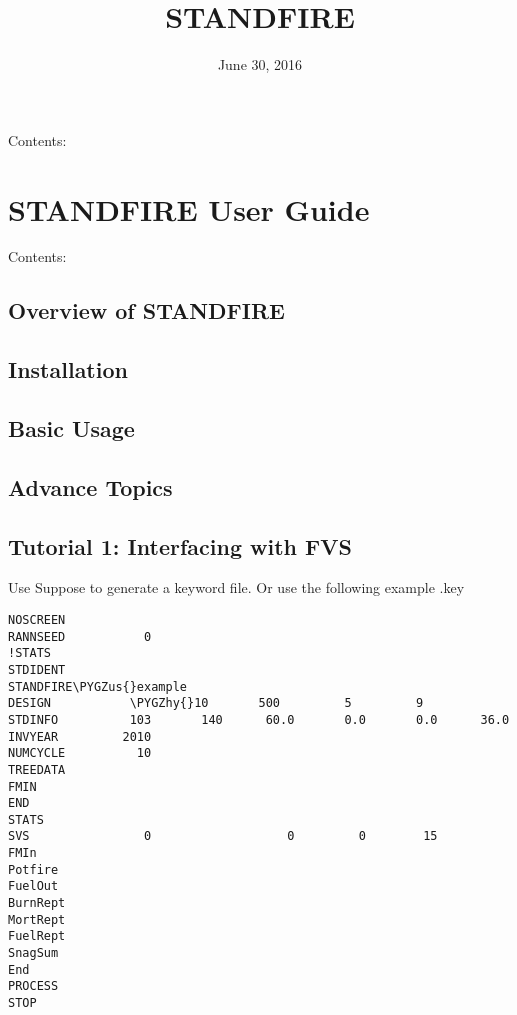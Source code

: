 \documentclass[letterpaper,10pt,english]{sphinxmanual}
\title{STANDFIRE}
\date{June 30, 2016}
\author{}
\def\PYGZus{\char`\_}
\def\PYGZhy{\char`\-}
\begin{document}
\maketitle
\tableofcontents
{}\label{index::doc}


Contents:


\chapter{STANDFIRE User Guide}
\label{user_guide:standfire-user-guide}\label{user_guide::doc}\label{user_guide:welcome-to-standfire}
Contents:


\section{Overview of STANDFIRE}
\label{overview:overview-of-standfire}\label{overview::doc}

\section{Installation}
\label{installation:installation}\label{installation::doc}

\section{Basic Usage}
\label{basic_usage::doc}\label{basic_usage:basic-usage}

\section{Advance Topics}
\label{advance_topics:advance-topics}\label{advance_topics::doc}

\section{Tutorial 1: Interfacing with FVS}
\label{tutorial_1:tutorial-1-interfacing-with-fvs}\label{tutorial_1::doc}
Use Suppose to generate a keyword file. Or use the following example .key

\begin{Verbatim}[commandchars=\\\{\}]
NOSCREEN
RANNSEED           0
!STATS
STDIDENT
STANDFIRE\PYGZus{}example
DESIGN           \PYGZhy{}10       500         5         9
STDINFO          103       140      60.0       0.0       0.0      36.0
INVYEAR         2010
NUMCYCLE          10
TREEDATA
FMIN
END
STATS
SVS                0                   0         0        15
FMIn
Potfire
FuelOut
BurnRept
MortRept
FuelRept
SnagSum
End
PROCESS
STOP
\end{Verbatim}
\end{document}
